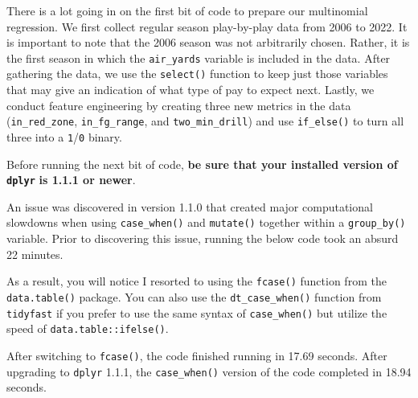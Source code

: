 \documentclass[
  letterpaper,
]{krantz}
\begin{document}
There is a lot going in on the first bit of code to prepare our
multinomial regression. We first collect regular season play-by-play
data from 2006 to 2022. It is important to note that the 2006 season was
not arbitrarily chosen. Rather, it is the first season in which the
\texttt{air\_yards} variable is included in the data. After gathering
the data, we use the \texttt{select()} function to keep just those
variables that may give an indication of what type of pay to expect
next. Lastly, we conduct feature engineering by creating three new
metrics in the data (\texttt{in\_red\_zone}, \texttt{in\_fg\_range}, and
\texttt{two\_min\_drill}) and use \texttt{if\_else()} to turn all three
into a \texttt{1}/\texttt{0} binary.

\begin{tcolorbox}[enhanced jigsaw, colback=white, leftrule=.75mm, breakable, colframe=quarto-callout-warning-color-frame, bottomtitle=1mm, rightrule=.15mm, left=2mm, opacityback=0, bottomrule=.15mm, arc=.35mm, coltitle=black, colbacktitle=quarto-callout-warning-color!10!white, toptitle=1mm, titlerule=0mm, title=\textcolor{quarto-callout-warning-color}{\faExclamationTriangle}\hspace{0.5em}{Warning}, toprule=.15mm, opacitybacktitle=0.6]

Before running the next bit of code, \textbf{be sure that your installed
version of \texttt{dplyr}} \textbf{is 1.1.1 or newer}.

An issue was discovered in version 1.1.0 that created major
computational slowdowns when using \texttt{case\_when()} and
\texttt{mutate()} together within a \texttt{group\_by()} variable. Prior
to discovering this issue, running the below code took an absurd 22
minutes.

As a result, you will notice I resorted to using the \texttt{fcase()}
function from the \texttt{data.table()} package. You can also use the
\texttt{dt\_case\_when()} function from \texttt{tidyfast} if you prefer
to use the same syntax of \texttt{case\_when()} but utilize the speed of
\texttt{data.table::ifelse()}.

After switching to \texttt{fcase()}, the code finished running in 17.69
seconds. After upgrading to \texttt{dplyr} 1.1.1, the
\texttt{case\_when()} version of the code completed in 18.94 seconds.

\end{tcolorbox}
\end{document}
